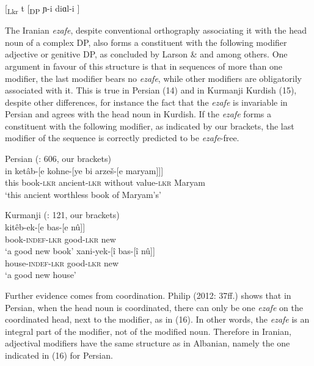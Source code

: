 \documentclass[output=paper]{langsci/langscibook}
\begin{document}
\ea%
    \label{ex:manzini:13}
    [\textsubscript{Lkr} t  [\textsubscript{DP} ɲ-i diɑl-i ]     
\z

The Iranian \textit{ezafe}, despite conventional orthography associating it with the head noun of a complex DP, also forms a constituent with the following modifier adjective or genitive DP, as concluded by Larson \& \citet{Yamakido2008} and \citet{Philip2012} among others. One argument in favour of this structure is that in sequences of more than one modifier, the last modifier bears no \textit{ezafe}, while other modifiers are obligatorily associated with it. This is true in Persian (14) and in Kurmanji Kurdish (15), despite other differences, for instance the fact that the \textit{ezafe} is invariable in Persian and agrees with the head noun in Kurdish. If the \textit{ezafe} forms a constituent with the following modifier, as indicated by our brackets, the last modifier of the sequence is correctly predicted to be \textit{ezafe}{}-free. 

\ea%
         Persian (\citealt{Samvelian2007}: 606, our brackets)\label{ex:manzini:14}\\
    \gll in   ketâb-[e   kohne-[ye   bi arzeš-[e     maryam]]]\\
         this   book{}-\textsc{lkr}    ancient{}-\textsc{lkr}    without value{}-\textsc{lkr}    Maryam\\
    \glt ‘this ancient worthless book of Maryam’s’     
    \z

  
\ea%
    Kurmanji (\citealt{Yamakido2005}: 121, our brackets)\label{ex:manzini:15}\\
    \ea
    \gll kitêb-ek-[e    bas-[e    nû]]\\
         book-\textsc{indef-lkr}   good-\textsc{lkr}   new\\
    \glt ‘a good new book’
    \ex  
    \gll xani-yek-[î    bas-[î    nû]]\\
         house-\textsc{indef-lkr}   good-\textsc{lkr}   new\\
    \glt ‘a good new house’
    \z
\z    

Further evidence comes from coordination. Philip (2012: 37ff.) shows that in Persian, when the head noun is coordinated, there can only be one \textit{ezafe} on the coordinated head, next to the modifier, as in (16). In other words, the \textit{ezafe} is an integral part of the modifier, not of the modified noun. Therefore in Iranian, adjectival modifiers have the same structure as in Albanian, namely the one indicated in (16) for Persian.
\end{document}
